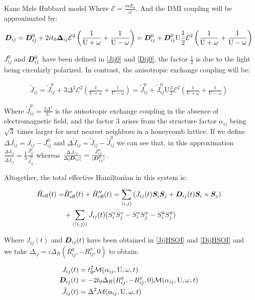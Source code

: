 \begin{section}{Kane Mele Hubbard model}
Where $\mathcal{E} = \frac{eaE_0}{\omega}$. And the DMI coupling will be approximated by:

\begin{align*}
\boldsymbol{D}_{ij} = \boldsymbol{D}_{ij}^0 + 2it_0\boldsymbol{\Delta}_{ij}  \mathcal{E}^2 \left( \frac{1}{\text{U}+\omega} + \frac{1}{\text{U}-\omega} \right) = \boldsymbol{D}_{ij}^0 + \boldsymbol{D}_{ij}^0 \text{U}\frac{1}{2} \mathcal{E}^2 \left( \frac{1}{\text{U}+\omega} + \frac{1}{\text{U}-\omega} \right)
\end{align*}

$J_{ij}^0$ and $\boldsymbol{D}_{ij}^0$ have been defined in \ref{Jij0} and \ref{Dij0}, the factor $\frac{1}{2}$ is due to the light being circularly polarized. In contrast, the anisotropic exchange coupling will be:

\begin{align*}
\tilde{J}_{ij} = \tilde{J}_{ij}^0 + 3 \Delta^2 \mathcal{E}^2 \left( \frac{1}{\text{U}+\omega} + \frac{1}{\text{U}-\omega} \right) = \tilde{J}_{ij}^0 + \tilde{J}_{ij}^0 \text{U} \frac{3}{2} \mathcal{E}^2 \left( \frac{1}{\text{U}+\omega} + \frac{1}{\text{U}-\omega} \right)
\end{align*}

Where $\tilde{J}_{ij}^0 = \frac{2\Delta^2}{\text{U}}$ is the anisotropic exchange coupling in the absence of electromagnetic field, and the factor $3$ arises from the structure factor $\alpha_{ij}$ being $\sqrt{3}$ times larger for next nearest neighbors in a honeycomb lattice. If we define $\Delta J_{ij} = J_{ij} - J_{ij}^0$ and $\Delta \tilde{J}_{ij} = \tilde{J}_{ij} - \tilde{J}_{ij}^0$ we can see that, in this approximation $\frac{\Delta J_{ij}}{\Delta \tilde{J}_{ij}} = \frac{1}{3}\frac{J_{ij}^0}{\tilde{J}_{ij}^0}$ whereas $\frac{\Delta J_{ij}}{\Delta |\boldsymbol{D}_{ij}|} = \frac{J_{ij}^0}{|\boldsymbol{D}_{ij}^0|}$.

Altogether, the total effective Hamiltonian in this system is:

\begin{align}
\hat{H}_{\text{eff}}(t) = &\hat{H}_{\text{eff}}'(t) + \hat{H}_{\text{eff}}''(t) = \sum_{\langle i,j \rangle} \left( J_{ij}(t)\boldsymbol{S}_i\boldsymbol{S}_j + \boldsymbol{D}_{ij}(t) \boldsymbol{S}_i \times \boldsymbol{S}_j \right) \nonumber \\
&+ \sum_{\langle \langle i,j \rangle \rangle} \tilde{J}_{ij}(t) (S_i^zS_j^z - S_i^xS_j^x - S_i^yS_j^y)
\end{align}

Where $J_{ij}(t)$ and $\boldsymbol{D}_{ij}(t)$ have been obtained in \ref{JijHSOI} and \ref{DijHSOI} and we take $\Delta_{ij} = i\Delta_R (R_{ij}^y, - R_{ij}^x, 0)$ to obtain:

\begin{align*}
J_{ij}(t) &= t_0^2\mathcal{M}(\alpha_{ij}, \text{U}, \omega, t) \\
\boldsymbol{D}_{ij}(t) &= -2t_0\Delta_R (R_{ij}^y, - R_{ij}^x, 0) \mathcal{M}(\alpha_{ij}, \text{U}, \omega, t) \\
\tilde{J}_{ij}(t) &= \Delta^2 \mathcal{M}(\alpha_{ij}, \text{U}, \omega, t)
\end{align*}

\end{section}
